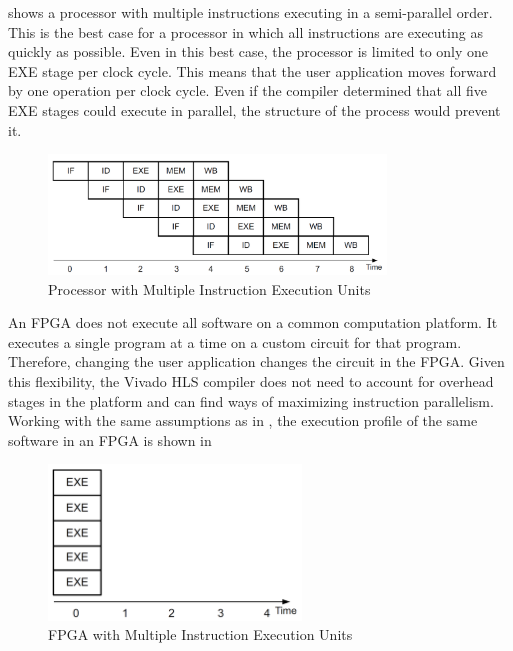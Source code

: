 \par {} shows a processor with multiple instructions executing in a semi-parallel order.
This is the best case for a processor in which all instructions are executing as quickly as
possible. Even in this best case, the processor is limited to only one EXE stage per clock
cycle. This means that the user application moves forward by one operation per clock cycle.
Even if the compiler determined that all five EXE stages could execute in parallel, the
structure of the process would prevent it.

\begin{figure}[H]
  \begin{center}
      \includegraphics[width=0.8\textwidth]{images/multiProcessor.png}
      \caption{Processor with Multiple Instruction Execution Units}
      \label{multiProcessor}
  \end{center}
\end{figure}

An FPGA does not execute all software on a common computation platform. It executes a
single program at a time on a custom circuit for that program. Therefore, changing the user
application changes the circuit in the FPGA. Given this flexibility, the Vivado HLS compiler does not need to account for overhead stages
in the platform and can find ways of maximizing instruction parallelism. Working with the
same assumptions as in , the execution profile of the same software in an FPGA is
shown in 

\begin{figure}[H]
  \begin{center}
      \includegraphics[width=0.6\textwidth]{images/multiFPGA.png}
      \caption{FPGA with Multiple Instruction Execution Units}
      \label{multiFPGA}
  \end{center}
\end{figure}

